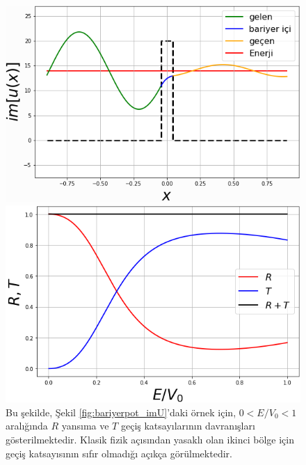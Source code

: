 \documentclass[a4paper,12pt, twoside]{article}
\begin{document}
\begin{figure}[hbtp]
	\begin{minipage}{.48\textwidth}
		\centering
		\includegraphics[width=\linewidth]{figurler/Bariyer_Potansiyeli_imU.png}
		\caption{Bir kuantum dalganın sanal kısmının bir bariyer potansiyelinden tünellemesi. Bu örnek için keyfi birimlerde: $a=0.045, E=14, V_0 = 20$ ve $\hbar = m = 1$ alınmıştır. $E/V_0 = 14/20 = 0.7$ için $T>0.8$ olduğu Şekil \ref{fig:bariyerpot_TR}'den görülebilir.
		}
		\label{fig:bariyerpot_imU}
	\end{minipage}
	\hspace{24pt}
	\begin{minipage}{.48\textwidth}
		\centering
		\includegraphics[width=\linewidth]{figurler/Bariyer_Potansiyeli_TR_EV0.png}
		\caption{Bu şekilde, Şekil \ref{fig:bariyerpot_imU}'daki örnek için, $0<E/V_0<1$ aralığında $R$ yansıma ve $T$ geçiş katsayılarının davranışları gösterilmektedir. Klasik fizik açısından yasaklı olan ikinci bölge için geçiş katsayısının sıfır olmadığı açıkça görülmektedir.}
		\label{fig:bariyerpot_TR}
	\end{minipage}
\end{figure}
\end{document}
